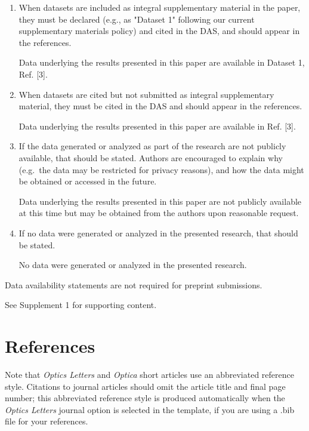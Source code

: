 \documentclass[9pt,twocolumn,twoside]{opticajnl}
\begin{document}
\begin{backmatter}
  \begin{enumerate}
    \item When datasets are included as integral supplementary material in the paper, they must be declared (e.g., as "Dataset 1" following our current supplementary materials policy) and cited in the DAS, and should appear in the references.

	     Data underlying the results presented in this paper are available in Dataset 1, Ref. [3].

    \item When datasets are cited but not submitted as integral supplementary material, they must be cited in the DAS and should appear in the references.

	     Data underlying the results presented in this paper are available in Ref. [3].

    \item If the data generated or analyzed as part of the research are not publicly available, that should be stated. Authors are encouraged to explain why (e.g.~the data may be restricted for privacy reasons), and how the data might be obtained or accessed in the future.

	     Data underlying the results presented in this paper are not publicly available at this time but may be obtained from the authors upon reasonable request.

    \item If no data were generated or analyzed in the presented research, that should be stated.

	     No data were generated or analyzed in the presented research.
  \end{enumerate}

  \bigskip

  \noindent Data availability statements are not required for preprint submissions.

  See Supplement 1 for supporting content.

\end{backmatter}

\section{References}

Note that \emph{Optics Letters} and \emph{Optica} short articles use an abbreviated reference style. Citations to journal articles should omit the article title and final page number; this abbreviated reference style is produced automatically when the \emph{Optics Letters} journal option is selected in the template, if you are using a .bib file for your references.
\end{document}
